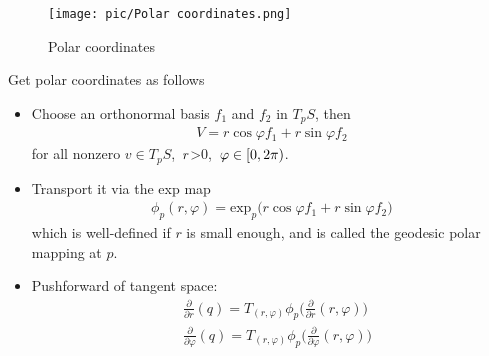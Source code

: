 \documentclass[10pt]{article}
\begin{document}
            \begin{marginfigure}
                \vspace{2cm}
                \begin{figure}[H]
                    \centering
                    \texttt{[image: pic/Polar coordinates.png]}
                    \caption{Polar coordinates}
                \end{figure}
		\end{marginfigure}
            \begin{definition}
                Get polar coordinates as follows
                \begin{itemize}
                    \item Choose an orthonormal basis $f_1$ and $f_2$ in $T_pS$, then
                    \begin{equation*}
                        \begin{aligned}
                            V = r\cos\varphi f_1 + r\sin\varphi f_2
                        \end{aligned}
                    \end{equation*}
                    for all nonzero $v\in T_pS$, $\thinspace r$>0, $\thinspace\varphi\in[0, 2\pi)$.
                    \item Transport it via the exp map
                    \begin{equation*}
                        \begin{aligned}
                            \phi_p(r,\varphi) = \text{exp}_p\big(r\cos\varphi f_1 + r\sin\varphi f_2\big)
                        \end{aligned}
                    \end{equation*}
                    which is well-defined if $r$ is small enough, and is called the geodesic polar mapping at $p$.
                    \item Pushforward of tangent space:
                    \begin{equation*}
                        \begin{aligned}
                            &\frac{\partial}{\partial r}(q) = T_{(r,\varphi)}\phi_p\bigg( \frac{\partial}{\partial r}(r, \varphi) \bigg) \\
                            &\frac{\partial}{\partial \varphi}(q) = T_{(r,\varphi)}\phi_p\bigg( \frac{\partial}{\partial \varphi}(r, \varphi) \bigg)
                        \end{aligned}

\end{equation*}
\end{itemize}
\end{definition}
\end{document}
